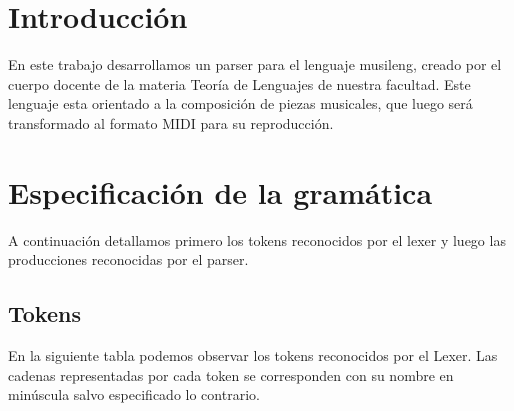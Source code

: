 \documentclass[a4paper,8pt]{article}
\begin{document}
\pagestyle{myheadings}
\maketitle
\thispagestyle{empty}
\tableofcontents


\newpage

\section{Introducción}
En este trabajo desarrollamos un parser para el lenguaje musileng, creado por el cuerpo docente de la materia Teoría de Lenguajes de nuestra facultad. Este lenguaje esta orientado a la composición de piezas musicales, que luego será transformado al formato MIDI para su reproducción.

\section{Especificación de la gramática}
A continuación detallamos primero los tokens reconocidos por el lexer y luego las producciones reconocidas por el parser.
\subsection{Tokens}
En la siguiente tabla podemos observar los tokens reconocidos por el Lexer. Las cadenas representadas por cada token se corresponden con su nombre en minúscula salvo especificado lo contrario.
\end{document}
